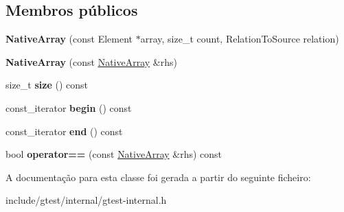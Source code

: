 \subsection*{Membros públicos}
\begin{DoxyCompactItemize}
\item 
\hypertarget{classtesting_1_1internal_1_1NativeArray_a568de999aca0fc0c2cc574fac2405872}{{\bfseries Native\-Array} (const Element $\ast$array, size\-\_\-t count, Relation\-To\-Source relation)}\label{classtesting_1_1internal_1_1NativeArray_a568de999aca0fc0c2cc574fac2405872}

\item 
\hypertarget{classtesting_1_1internal_1_1NativeArray_abb346ac3040f5da733f594cc2d5958bc}{{\bfseries Native\-Array} (const \hyperlink{classtesting_1_1internal_1_1NativeArray}{Native\-Array} \&rhs)}\label{classtesting_1_1internal_1_1NativeArray_abb346ac3040f5da733f594cc2d5958bc}

\item 
\hypertarget{classtesting_1_1internal_1_1NativeArray_a45de2485baac8bf148e2943828094a40}{size\-\_\-t {\bfseries size} () const }\label{classtesting_1_1internal_1_1NativeArray_a45de2485baac8bf148e2943828094a40}

\item 
\hypertarget{classtesting_1_1internal_1_1NativeArray_a49c534d29034d9230372ada54ef961bb}{const\-\_\-iterator {\bfseries begin} () const }\label{classtesting_1_1internal_1_1NativeArray_a49c534d29034d9230372ada54ef961bb}

\item 
\hypertarget{classtesting_1_1internal_1_1NativeArray_a4957ad1ebf7c21eab07d5e0ae2bb17aa}{const\-\_\-iterator {\bfseries end} () const }\label{classtesting_1_1internal_1_1NativeArray_a4957ad1ebf7c21eab07d5e0ae2bb17aa}

\item 
\hypertarget{classtesting_1_1internal_1_1NativeArray_a60af8d9c429771ee131b5ddf7e06e3c9}{bool {\bfseries operator==} (const \hyperlink{classtesting_1_1internal_1_1NativeArray}{Native\-Array} \&rhs) const }\label{classtesting_1_1internal_1_1NativeArray_a60af8d9c429771ee131b5ddf7e06e3c9}

\end{DoxyCompactItemize}


A documentação para esta classe foi gerada a partir do seguinte ficheiro\-:\begin{DoxyCompactItemize}
\item 
include/gtest/internal/gtest-\/internal.\-h\end{DoxyCompactItemize}
